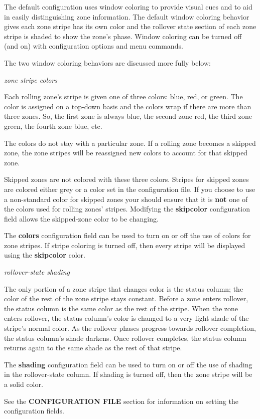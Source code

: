 The default  configuration uses window coloring to provide
visual cues and to aid in easily distinguishing zone information.  The default
window coloring behavior gives each zone stripe has its own color and the
rollover state section of each zone stripe is shaded to show the zone's phase.
Window coloring can be turned off (and on) with configuration options and menu
commands.

The two window coloring behaviors are discussed more fully below:

\begin{description}

\item {\it zone stripe colors}

Each rolling zone's stripe is given one of three colors:  blue, red, or green.
The color is assigned on a top-down basis and the colors wrap if there are
more than three zones.  So, the first zone is always blue, the second zone
red, the third zone green, the fourth zone blue, etc.

The colors do not stay with a particular zone.  If a rolling zone becomes a
skipped zone, the zone stripes will be reassigned new colors to account for
that skipped zone.

Skipped zones are not colored with these three colors.  Stripes for skipped
zones are colored either grey or a color set in the configuration file.  If
you choose to use a non-standard color for skipped zones your should ensure
that it is {\bf not} one of the colors used for rolling zones' stripes.
Modifying the {\bf skipcolor} configuration field allows the skipped-zone color
to be changing.

The {\bf colors} configuration field can be used to turn on or off the use of
colors for zone stripes.  If stripe coloring is turned off, then every stripe
will be displayed using the {\bf skipcolor} color.

\item {\it rollover-state shading}

The only portion of a zone stripe that changes color is the status column; the
color of the rest of the zone stripe stays constant.  Before a zone enters
rollover, the status column is the same color as the rest of the stripe.  When
the zone enters rollover, the status column's color is changed to a very light
shade of the stripe's normal color.  As the rollover phases progress towards
rollover completion, the status column's shade darkens.  Once rollover
completes, the status column returns again to the same shade as the rest of
that stripe.

The {\bf shading} configuration field can be used to turn on or off the use of
shading in the rollover-state column.  If shading is turned off, then the zone
stripe will be a solid color.

See the {\bf CONFIGURATION FILE} section for information on setting the
configuration fields.

\end{description}

